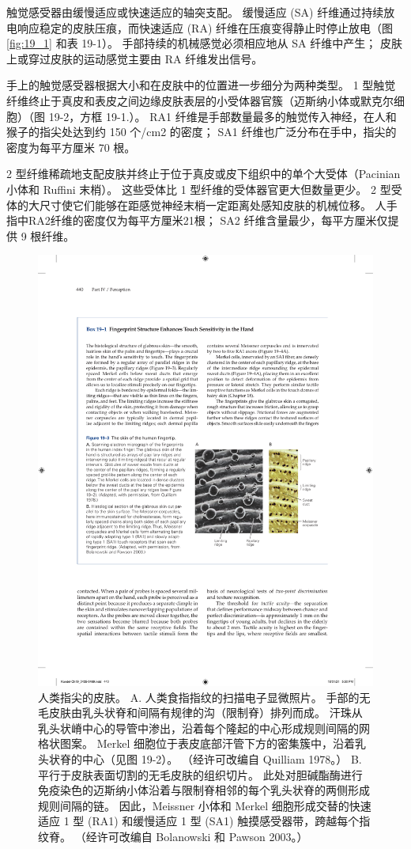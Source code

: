 触觉感受器由缓慢适应或快速适应的轴突支配。 
缓慢适应 (SA) 纤维通过持续放电响应稳定的皮肤压痕，而快速适应 (RA) 纤维在压痕变得静止时停止放电（图 \ref{fig:19_1} 和表 19-1）。 
手部持续的机械感觉必须相应地从 SA 纤维中产生； 皮肤上或穿过皮肤的运动感觉主要由 RA 纤维发出信号。


手上的触觉感受器根据大小和在皮肤中的位置进一步细分为两种类型。 
1 型触觉纤维终止于真皮和表皮之间边缘皮肤表层的小受体器官簇（迈斯纳小体或默克尔细胞）（图 19-2，方框 19-1.）。 
RA1 纤维是手部数量最多的触觉传入神经，在人和猴子的指尖处达到约 150 个/cm2 的密度； SA1 纤维也广泛分布在手中，指尖的密度为每平方厘米 70 根。


2 型纤维稀疏地支配皮肤并终止于位于真皮或皮下组织中的单个大受体（Pacinian 小体和 Ruffini 末梢）。 
这些受体比 1 型纤维的受体器官更大但数量更少。 
2 型受体的大尺寸使它们能够在距感觉神经末梢一定距离处感知皮肤的机械位移。 
人手指中RA2纤维的密度仅为每平方厘米21根； 
SA2 纤维含量最少，每平方厘米仅提供 9 根纤维。

\begin{figure}[htbp]
	\centering
	\includegraphics[width=0.5\linewidth]{chap19/fig_19_3}
	\caption{人类指尖的皮肤。 
		A. 人类食指指纹的扫描电子显微照片。 
		手部的无毛皮肤由乳头状脊和间隔有规律的沟（限制脊）排列而成。 
		汗珠从乳头状嵴中心的导管中渗出，沿着每个隆起的中心形成规则间隔的网格状图案。 
		Merkel 细胞位于表皮底部汗管下方的密集簇中，沿着乳头状脊的中心（见图 19-2）。
		 （经许可改编自 Quilliam 1978。） 
		 B. 平行于皮肤表面切割的无毛皮肤的组织切片。 此处对胆碱酯酶进行免疫染色的迈斯纳小体沿着与限制脊相邻的每个乳头状脊的两侧形成规则间隔的链。 
		 因此，Meissner 小体和 Merkel 细胞形成交替的快速适应 1 型 (RA1) 和缓慢适应 1 型 (SA1) 触摸感受器带，跨越每个指纹脊。 （经许可改编自 Bolanowski 和 Pawson 2003。）}
	\label{fig:19_3}
\end{figure}



